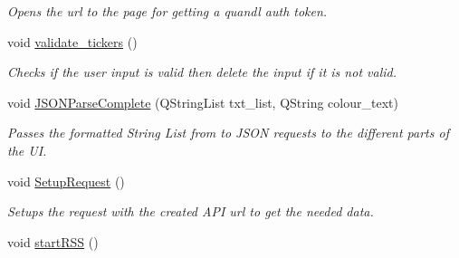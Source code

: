 \begin{DoxyCompactItemize}
\begin{DoxyCompactList}\small\item\em Opens the url to the page for getting a quandl auth token. \end{DoxyCompactList}\item 
\hypertarget{class_t_k_r_t_a_p_ad012d6c7aad3cfcc06f5df8a392d308b}{void \hyperlink{class_t_k_r_t_a_p_ad012d6c7aad3cfcc06f5df8a392d308b}{validate\+\_\+tickers} ()}\label{class_t_k_r_t_a_p_ad012d6c7aad3cfcc06f5df8a392d308b}

\begin{DoxyCompactList}\small\item\em Checks if the user input is valid then delete the input if it is not valid. \end{DoxyCompactList}\item 
void \hyperlink{class_t_k_r_t_a_p_a0dc4e02bce5f50d8616a7118a021be34}{J\+S\+O\+N\+Parse\+Complete} (Q\+String\+List txt\+\_\+list, Q\+String colour\+\_\+text)
\begin{DoxyCompactList}\small\item\em Passes the formatted String List from to J\+S\+O\+N requests to the different parts of the U\+I. \end{DoxyCompactList}\item 
\hypertarget{class_t_k_r_t_a_p_a9105ea4fbf86ffb8e373275677ea99ee}{void \hyperlink{class_t_k_r_t_a_p_a9105ea4fbf86ffb8e373275677ea99ee}{Setup\+Request} ()}\label{class_t_k_r_t_a_p_a9105ea4fbf86ffb8e373275677ea99ee}

\begin{DoxyCompactList}\small\item\em Setups the request with the created A\+P\+I url to get the needed data. \end{DoxyCompactList}\item 
\hypertarget{class_t_k_r_t_a_p_a2e63c2e8c0b9f5662b06e8686eac0e64}{void \hyperlink{class_t_k_r_t_a_p_a2e63c2e8c0b9f5662b06e8686eac0e64}{start\+R\+S\+S} ()}\label{class_t_k_r_t_a_p_a2e63c2e8c0b9f5662b06e8686eac0e64}


\end{DoxyCompactItemize}
